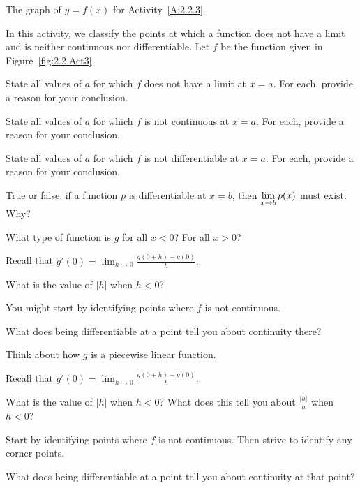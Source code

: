 \begin{marginfigure}[6cm]
\caption{The graph of $y = f(x)$ for Activity~\ref{A:2.2.3}.} \label{fig:2.2.Act3}
\end{marginfigure}

\begin{activity} \label{A:2.2.3} 
In this activity, we classify the points at which a function does not have a limit and is neither continuous nor differentiable.  Let $f$ be the function given in Figure~\ref{fig:2.2.Act3}.
\ba
\item State all values of $a$ for which $f$ does not have a limit at $x = a$.  For each, provide a reason for your conclusion.
\item State all values of $a$ for which $f$ is not continuous at $x = a$.  For each, provide a reason for your conclusion.
\item State all values of $a$ for which $f$ is not differentiable at $x = a$.  For each, provide a reason for your conclusion.
\item True or false: if a function $p$ is differentiable at $x = b$, then $\displaystyle \lim_{x \to b} p(x)$ must exist.  Why?	
\ea

\end{activity}
\begin{smallhint}
\ba
	\item What type of function is $g$ for all $x < 0$?  For all $x > 0$?
	\item Recall that $g'(0) = \lim_{h \to 0} \frac{g(0 + h) - g(0)}{h}.$
	\item What is the value of $|h|$ when $h < 0$?
	\item You might start by identifying points where $f$ is not continuous.
	\item What does being differentiable at a point tell you about continuity there?	
\ea
\end{smallhint}
\begin{bighint}
\ba
	\item Think about how $g$ is a piecewise linear function.
	\item Recall that $g'(0) = \lim_{h \to 0} \frac{g(0 + h) - g(0)}{h}.$
	\item What is the value of $|h|$ when $h < 0$?  What does this tell you about $\frac{|h|}{h}$ when $h < 0$?
	\item Start by identifying points where $f$ is not continuous.  Then strive to identify any corner points.
	\item What does being differentiable at a point tell you about continuity at that point?	
\ea
\end{bighint}
